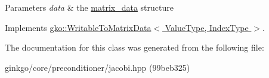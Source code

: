 \begin{DoxyParams}{Parameters}
{\em data} & the \hyperlink{structgko_1_1matrix__data}{matrix\+\_\+data} structure \\
\hline
\end{DoxyParams}


Implements \hyperlink{classgko_1_1WritableToMatrixData_a96036c3a4bf4c67fa93002808b8b14e2}{gko\+::\+Writable\+To\+Matrix\+Data$<$ Value\+Type, Index\+Type $>$}.



The documentation for this class was generated from the following file\+:\begin{DoxyCompactItemize}
\item 
ginkgo/core/preconditioner/jacobi.\+hpp (99beb325)\end{DoxyCompactItemize}

